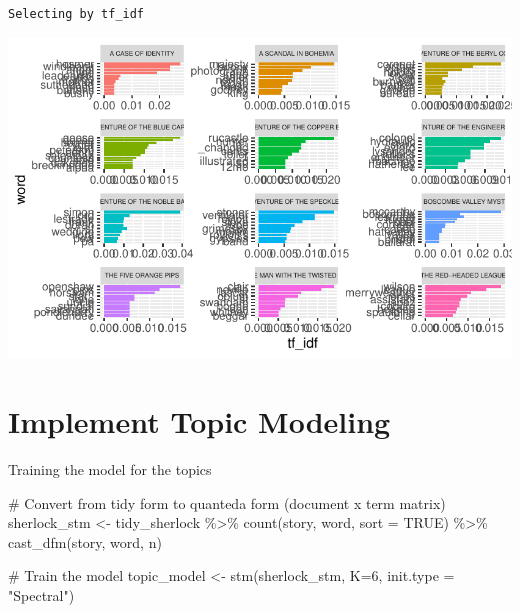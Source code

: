 \documentclass[
  letterpaper,
  DIV=11,
  numbers=noendperiod]{scrreprt}
\newenvironment{Shaded}{\begin{snugshade}}{\end{snugshade}}
\newcommand{\AttributeTok}[1]{\textcolor[rgb]{0.40,0.45,0.13}{#1}}
\newcommand{\CommentTok}[1]{\textcolor[rgb]{0.37,0.37,0.37}{#1}}
\newcommand{\ConstantTok}[1]{\textcolor[rgb]{0.56,0.35,0.01}{#1}}
\newcommand{\DecValTok}[1]{\textcolor[rgb]{0.68,0.00,0.00}{#1}}
\newcommand{\FunctionTok}[1]{\textcolor[rgb]{0.28,0.35,0.67}{#1}}
\newcommand{\NormalTok}[1]{\textcolor[rgb]{0.00,0.23,0.31}{#1}}
\newcommand{\OtherTok}[1]{\textcolor[rgb]{0.00,0.23,0.31}{#1}}
\newcommand{\SpecialCharTok}[1]{\textcolor[rgb]{0.37,0.37,0.37}{#1}}
\newcommand{\StringTok}[1]{\textcolor[rgb]{0.13,0.47,0.30}{#1}}
\begin{document}
\begin{verbatim}
Selecting by tf_idf
\end{verbatim}

\includegraphics{src/practice/topic-modeling-r_files/figure-pdf/unnamed-chunk-6-1.pdf}

\section{Implement Topic Modeling}\label{implement-topic-modeling}

Training the model for the topics

\begin{Shaded}
\begin{Highlighting}[]
\CommentTok{\# Convert from tidy form to quanteda form (document x term matrix)}
\NormalTok{sherlock\_stm }\OtherTok{\textless{}{-}}\NormalTok{ tidy\_sherlock }\SpecialCharTok{\%\textgreater{}\%} 
  \FunctionTok{count}\NormalTok{(story, word, }\AttributeTok{sort =} \ConstantTok{TRUE}\NormalTok{) }\SpecialCharTok{\%\textgreater{}\%} 
  \FunctionTok{cast\_dfm}\NormalTok{(story, word, n)}

\CommentTok{\# Train the model}
\NormalTok{topic\_model }\OtherTok{\textless{}{-}} \FunctionTok{stm}\NormalTok{(sherlock\_stm, }\AttributeTok{K=}\DecValTok{6}\NormalTok{, }\AttributeTok{init.type =} \StringTok{"Spectral"}\NormalTok{)}
\end{Highlighting}
\end{Shaded}
\end{document}
